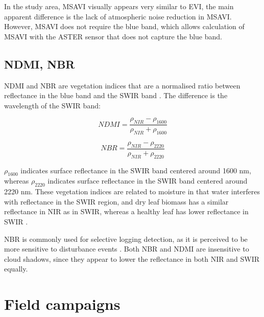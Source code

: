 \documentclass[a4paper,12pt]{scrbook}
\begin{document}
In the study area, \ac{MSAVI} visually appears very similar to \ac{EVI}, the main apparent difference is the lack of atmospheric noise reduction in \ac{MSAVI}. However, \ac{MSAVI} does not require the blue band, which allows calculation of \ac{MSAVI} with the \ac{ASTER} sensor that does not capture the blue band.

\subsection{NDMI, NBR}

\ac{NDMI} and \ac{NBR} are vegetation indices that are a normalised ratio between reflectance in the blue band and the \ac{SWIR} band \citep{key_normalized_2002}. The difference is the wavelength of the \ac{SWIR} band:

$$ NDMI = \frac{\rho_{NIR} - \rho_{1600}}{\rho_{NIR} + \rho_{1600}} $$

$$ NBR = \frac{\rho_{NIR} - \rho_{2220}}{\rho_{NIR} + \rho_{2220}} $$

$\rho_{1600}$ indicates surface reflectance in the \ac{SWIR} band centered around 1600 nm, whereas $\rho_{2220}$ indicates surface reflectance in the \ac{SWIR} band centered around 2220 nm. These vegetation indices are related to moisture in that water interferes with reflectance in the \ac{SWIR} region, and dry leaf biomass has a similar reflectance in \ac{NIR} as in \ac{SWIR}, whereas a healthy leaf has lower reflectance in \ac{SWIR} \citep{cibula_response_1992}.

\ac{NBR} is commonly used for selective logging detection, as it is perceived to be more sensitive to disturbance events \citep{schneibel_assessment_2017, shimizu_using_2017}. Both \ac{NBR} and \ac{NDMI} are insensitive to cloud shadows, since they appear to lower the reflectance in both \ac{NIR} and \ac{SWIR} equally.

\section{Field campaigns} \label{sec-campaigns}
\end{document}
